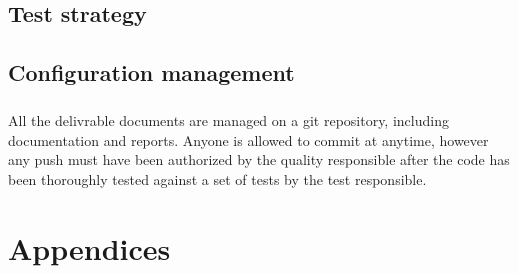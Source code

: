 \documentclass{report}
\begin{document}
\section{Test strategy}

\paragraph{}
\hspace{4mm}\textnormal{}

\section{Configuration management}

\paragraph{}
\hspace{4mm}\textnormal{All the delivrable documents are managed on a git repository, including documentation and reports.
Anyone is allowed to commit at anytime, however any push must have been authorized by the quality responsible after the code
has been thoroughly tested against a set of tests by the test responsible.}

\chapter{Appendices}
\end{document}
